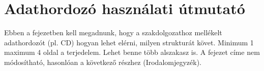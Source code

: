 \chapter*{Adathordozó használati útmutató}

Ebben a fejezetben kell megadnunk, hogy a szakdolgozathoz mellékelt adathordozót (pl. CD) hogyan lehet elérni, milyen strukturát követ. Minimum 1 maximum 4 oldal a terjedelem. Lehet benne több alszakasz is. A fejezet címe nem módosítható, hasonlóan a következő részhez (Irodalomjegyzék).
